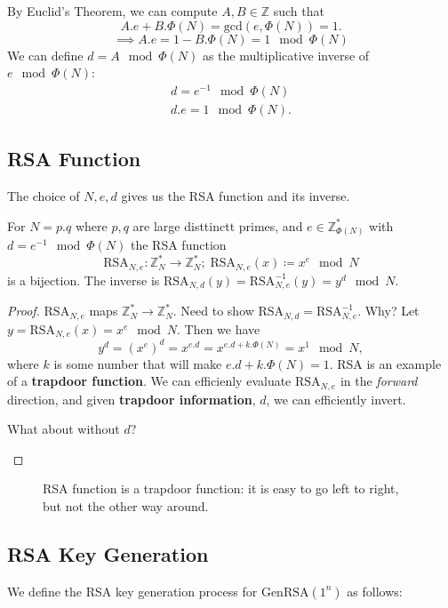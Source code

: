 By Euclid's Theorem, we can compute \(A, B \in \mathbb{Z}\) such that
\[
    A.e + B.\Phi (N) = \text{gcd}(e, \Phi (N)) = 1.
\]
\[
    \implies A.e = 1 - B.\Phi (N) = 1 \mod \Phi (N)
\]
We can define \(d=A \mod \Phi (N)\) as the multiplicative inverse of \(e \mod \Phi (N)\):
\begin{align*}
    d = e^{-1} \mod \Phi (N) \\
    d.e = 1 \mod \Phi (N).
\end{align*}

\subsection{RSA Function}
The choice of \(N, e, d\) gives us the RSA function and its inverse.

\begin{definition}
    For \(N = p . q\) where \(p, q\) are large disttinctt primes, and \(e \in \mathbb{Z} _{\Phi (N)}^*\) with \(d=e^{-1} \mod \Phi (N)\) the RSA function
    \[
        \text{RSA}_{N,e}: \mathbb{Z}_N^* \to \mathbb{Z} _N^* ; \; \text{RSA} _{N,e} (x) \coloneqq x^e \mod N
    \]
    is a bijection. The inverse is \(\text{RSA} _{N,d}(y)=\text{RSA} _{N,e}^{-1}(y)=y^d \mod N\).
\end{definition}
\begin{proof}
    \(\text{RSA} _{N,e}\) maps \(\mathbb{Z} _N^* \to \mathbb{Z} _N^*\). Need to show \(\text{RSA} _{N,d} = \text{RSA}_{N,e}^{-1}\). Why? Let \(y=\text{RSA} _{N,e}(x)=x^e \mod N\). Then we have
    \[
        y^d = (x^e)^d = x^{e.d} = x^{e.d + k. \Phi (N)} = x^1 \mod N,
    \]
    where \(k\) is some number that will make \(e.d + k.\Phi (N) = 1\).
    RSA is an example of a \textbf{trapdoor function}. We can efficienly evaluate \(\text{RSA}_{N,e} \) in the \emph{forward} direction, and given \textbf{trapdoor information}, \(d\), we can efficiently invert.
    \begin{remark}
        What about without \(d\)?
    \end{remark}
\end{proof}

\begin{figure}[H]
    \centering
    \caption{RSA function is a trapdoor function: it is easy to go left to right, but not the other way around.}
    \label{fig:rsatrapdoor}
\end{figure}

\subsection{RSA Key Generation}
We define the RSA key generation process for \(\text{GenRSA} (1^n)\) as follows:

